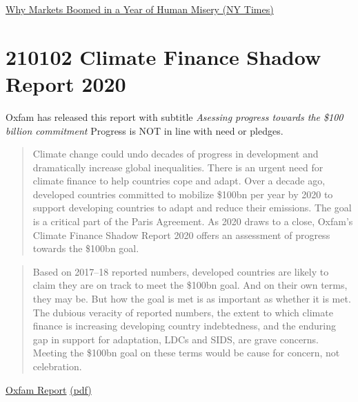 \documentclass[
]{book}
\begin{document}
\href{https://www.nytimes.com/2021/01/01/upshot/why-markets-boomed-2020.html}{Why Markets Boomed in a Year of Human Misery (NY Times)}

\hypertarget{climate-finance-shadow-report-2020}{%
\section{210102 Climate Finance Shadow Report 2020}\label{climate-finance-shadow-report-2020}}

Oxfam has released this report with subtitle \emph{Asessing progress towards the \$100 billion commitment}
Progress is NOT in line with need or pledges.

\begin{quote}
Climate change could undo decades of progress in development and dramatically increase global inequalities. There is an urgent need for climate finance to help countries cope and adapt.
Over a decade ago, developed countries committed to mobilize \$100bn per year by 2020 to support developing countries to adapt and reduce their emissions. The goal is a critical part of the Paris Agreement.
As 2020 draws to a close, Oxfam's Climate Finance Shadow Report 2020 offers an assessment of progress towards the \$100bn goal.
\end{quote}

\begin{quote}
Based on 2017--18 reported numbers, developed countries are likely to claim they are on track to meet
the \$100bn goal. And on their own terms, they may be. But how the goal is met is as important as whether
it is met. The dubious veracity of reported numbers, the extent to which climate finance is increasing
developing country indebtedness, and the enduring gap in support for adaptation, LDCs and SIDS, are grave
concerns. Meeting the \$100bn goal on these terms would be cause for concern, not celebration.
\end{quote}

\href{https://www.oxfam.org/en/research/climate-finance-shadow-report-2020}{Oxfam Report}
\href{/pdf/Oxfam_2020_Climate_Finance_Shadow_Report.pdf}{(pdf)}

  
\end{document}
